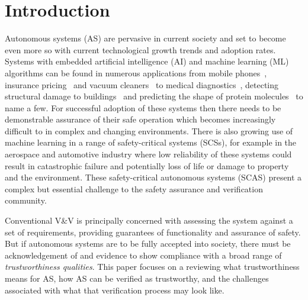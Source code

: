 


\section{Introduction}
Autonomous systems (AS) are pervasive in current society and set to become even more so with current technological growth trends and adoption rates. Systems with embedded artificial intelligence (AI) and machine learning (ML) algorithms can be found in numerous applications from mobile phones~\cite{medium_ai_phones}, insurance pricing~\cite{kuo2020towards} and vacuum cleaners~\cite{tf_vacuum} to medical diagnostics~\cite{kononenko2001machine}, detecting structural damage to buildings~\cite{avci2021review} and predicting the shape of protein molecules~\cite{alpha_fold} to name a few.
%
For successful adoption of these systems then there needs to be demonstrable assurance of their safe operation which becomes increasingly difficult to in complex and changing environments.  
%
There is also growing use of machine learning in a range of safety-critical systems (SCSs), for example in the aerospace and automotive industry where low reliability of these systems could result in catastrophic failure and potentially loss of life or damage to property and the environment. These safety-critical autonomous systems (SCAS) present a complex but essential challenge to the safety assurance and verification community. 

%
Conventional V\&V is principally concerned with assessing the system against a set of requirements, providing guarantees of functionality and assurance of safety. But if autonomous systems are to be fully accepted into society, there must be acknowledgement of and evidence to show compliance with a broad range of \emph{trustworthiness qualities}. 
%
This paper focuses on a reviewing what trustworthiness means for AS, how AS can be verified as trustworthy, and the challenges associated with what that verification process may look like. 


